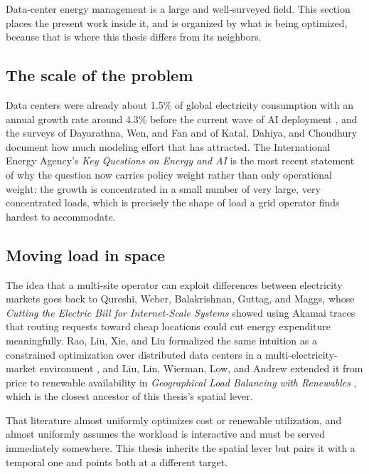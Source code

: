﻿\documentclass[12pt]{article}
\begin{document}
Data-center energy management is a large and well-surveyed field. This section
places the present work inside it, and is organized by what is being optimized,
because that is where this thesis differs from its neighbors.

\subsection{The scale of the problem}
\label{subsec:related-scale}

Data centers were already about 1.5\% of global electricity consumption with an
annual growth rate around 4.3\% before the current wave of AI deployment
\cite{vasques2019review}, and the surveys of Dayarathna, Wen, and Fan
\cite{dayarathna2016modeling} and of Katal, Dahiya, and Choudhury
\cite{katal2022energy} document how much modeling effort that has attracted. The
International Energy Agency's \emph{Key Questions on Energy and AI}
\cite{iea2025energyai} is the most recent statement of why the question now
carries policy weight rather than only operational weight: the growth is
concentrated in a small number of very large, very concentrated loads, which is
precisely the shape of load a grid operator finds hardest to accommodate.

\subsection{Moving load in space}
\label{subsec:related-space}

The idea that a multi-site operator can exploit differences between electricity
markets goes back to Qureshi, Weber, Balakrishnan, Guttag, and Maggs, whose
\emph{Cutting the Electric Bill for Internet-Scale Systems}
\cite{qureshi2009cutting} showed using Akamai traces that routing requests
toward cheap locations could cut energy expenditure meaningfully. Rao, Liu, Xie,
and Liu formalized the same intuition as a constrained optimization over
distributed data centers in a multi-electricity-market environment
\cite{rao2010minimizing}, and Liu, Lin, Wierman, Low, and Andrew extended it
from price to renewable availability in \emph{Geographical Load Balancing with
Renewables} \cite{liu2011geographical}, which is the closest ancestor of this
thesis's spatial lever.

That literature almost uniformly optimizes cost or renewable utilization, and
almost uniformly assumes the workload is interactive and must be served
immediately somewhere. This thesis inherits the spatial lever but pairs it with
a temporal one and points both at a different target.
\end{document}
